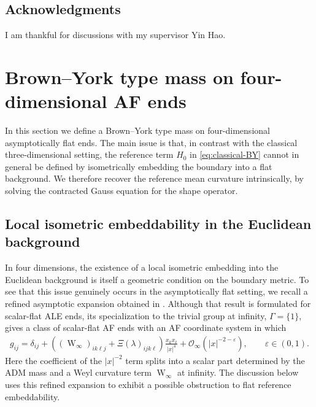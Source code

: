 \documentclass[10pt]{amsart}
\newcommand{\Weyl}{\operatorname{W}}
\theoremstyle{plain}
\theoremstyle{remark}
\begin{document}
	
	
	
	
	\subsection{Acknowledgments}
	
	I am thankful for discussions with my supervisor Yin Hao.
	
	\section{Brown--York type mass on four-dimensional AF ends}\label{sec:BY-mass}
	
	In this section we define a Brown--York type mass on four-dimensional
	asymptotically flat ends.  The main issue is that, in contrast with the
	classical three-dimensional setting, the reference term $H_0$ in \eqref{eq:classical-BY} cannot in general be
	defined by isometrically embedding the boundary into a flat background.
	We therefore recover the reference mean curvature intrinsically, by solving
	the contracted Gauss equation for the shape operator.
	
	\subsection{Local isometric embeddability in the Euclidean background}
	\label{subsec:local-embed}
	
	In four dimensions, the existence of a local isometric embedding into the Euclidean background is itself a geometric condition on the boundary metric. To see that this issue genuinely occurs in the asymptotically flat setting,
	we recall a refined asymptotic expansion obtained in \cite{YouALE26}.
	Although that result is formulated for scalar-flat ALE ends, its specialization
	to the trivial group at infinity, $\Gamma=\{1\}$, gives a class of
	scalar-flat AF ends with an AF coordinate system in which
	\begin{align}\label{eq:metric-expansion-after}
		g_{ij}
		=
		\delta_{ij}
		+
		\left(
		\left(\Weyl_\infty\right)_{ik\ell j}
		+
		\Xi(\lambda)_{ijk\ell}
		\right)
		\frac{x_kx_\ell}{|x|^4}
		+
		\mathcal O_\infty(|x|^{-2-\varepsilon}),
		\qquad
		\varepsilon\in(0,1).
	\end{align}
	Here the coefficient of the $|x|^{-2}$ term splits into a scalar part determined by the ADM mass
	and a Weyl curvature term $\Weyl_\infty$ at infinity.  The discussion below uses this refined expansion to exhibit a possible obstruction to flat reference
	embeddability.
	
\end{document}
